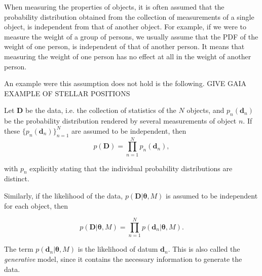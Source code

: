 When measuring the properties of objects, it is often assumed that the probability distribution obtained from the collection of measurements of a single object, is independent from that of another object. For example, if we were to measure the weight of a group of persons, we usually assume that the PDF of the weight of one person, is independent of that of another person. It means that measuring the weight of one person has no effect at all in the weight of another person.

{\color{red}
An example were this assumption does not hold is the following. GIVE GAIA EXAMPLE OF STELLAR POSITIONS
}

Let $\mathbf{D}$ be the data, i.e. the collection of statistics of the $N$ objects, and $p_n(\mathbf{d}_n)$ be the probability distribution rendered by several measurements of object $n$. If these $\{p_n(\mathbf{d}_n)\}_{n=1}^N$ are assumed to be independent, then
\begin{equation}
\label{eq:independence}
 p(\mathbf{D}) = \prod_{n=1}^N p_n(\mathbf{d}_n),
\end{equation}

 with $p_n$ explicitly stating that the individual probability distributions are distinct. 
 
Similarly, if the likelihood of the data, $p(\mathbf{D}|\boldsymbol{\theta},M)$ is assumed to be independent for each object, then

\begin{equation}
\label{eq:lik_datum}
 p(\mathbf{D}|\boldsymbol{\theta},M) = \prod_{n=1}^N p(\mathbf{d}_n|\boldsymbol{\theta},M).
\end{equation}

The term $p(\mathbf{d}_n|\boldsymbol{\theta},M)$ is the likelihood of datum $\mathbf{d}_n$. This is also called the \emph{generative} model, since it contains the necessary information to generate the data. 


